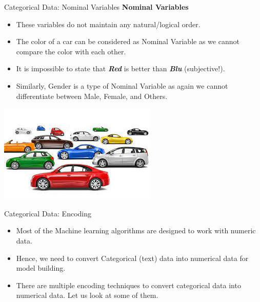 \documentclass[11pt]{beamer}
\begin{document}
\begin{frame}{Categorical Data: Nominal Variables}
\textbf{Nominal Variables}
	\begin{itemize}
		\item These variables do not maintain any natural/logical order. 
		\item The color of a car can be considered as Nominal Variable as we cannot compare the color with each other. 
		\item It is impossible to state that \textbf{\textit{Red}} is better than \textbf{\textit{Blu}} (subjective!). 
		\item Similarly, Gender is a type of Nominal Variable as again we cannot differentiate between Male, Female, and Others.
	\end{itemize}
\begin{center}
\includegraphics[scale=.5]{../05-pictures/lesson-2-1_pic_1.png} 
\end{center}	
\end{frame}
\begin{frame}{Categorical Data: Encoding}
	\begin{itemize}
		\item Most of the Machine learning algorithms are designed to work with numeric data. 
		\item Hence, we need to convert Categorical (text) data into numerical data for model building. 
		\item There are multiple encoding techniques to convert categorical data into numerical data. Let us look at some of them.
	\end{itemize}
\end{frame}
\end{document}
